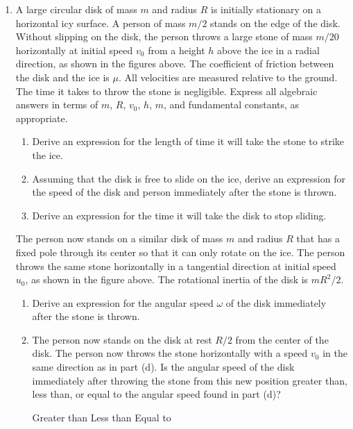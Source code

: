 \documentclass{../../../oss-classkick}
\begin{document}
\begin{enumerate}
\item A large circular disk of mass $m$ and radius $R$ is initially stationary
  on a horizontal icy surface. A person of mass $m/2$ stands on the edge of the
  disk. Without slipping on the disk, the person throws a large stone of mass
  $m/20$ horizontally at initial speed $v_0$ from a height $h$ above the ice in
  a radial direction, as shown in the figures above. The coefficient of
  friction between the disk and the ice is $\mu$. All velocities are measured
  relative to the ground. The time it takes to throw the stone is negligible.
  Express all algebraic answers in terms of $m$, $R$, $v_0$, $h$, $m$, and
  fundamental constants, as appropriate.
  \begin{enumerate}
  \item Derive an expression for the length of time it will take the stone to
    strike the ice.
  \item Assuming that the disk is free to slide on the ice, derive an
    expression for the speed of the disk and person immediately after the stone
    is thrown.
  \item Derive an expression for the time it will take the disk to stop sliding.
  \end{enumerate}
  \begin{center}
  \end{center}
  The person now stands on a similar disk of mass $m$ and radius $R$ that has a
  fixed pole through its center so that it can only rotate on the ice. The
  person throws the same stone horizontally in a tangential direction at
  initial speed $u_0$, as shown in the figure above. The rotational inertia of
  the disk is $mR^2/2$.
  \begin{enumerate}[resume]
  \item Derive an expression for the angular speed $\omega$ of the disk
    immediately after the stone is thrown.
  \item The person now stands on the disk at rest $R/2$ from the center of the
    disk. The person now throws the stone horizontally with a speed $v_0$ in
    the same direction as in part (d). Is the angular speed of the disk
    immediately after throwing the stone from this new position greater than,
    less than, or equal to the angular speed found in part (d)?

    \vspace{.1in}
    \underline{\hspace{.3in}} Greater than\hspace{.2in}
    \underline{\hspace{.3in}} Less than\hspace{.2in}
    \underline{\hspace{.3in}} Equal to
    

\end{enumerate}
\end{enumerate}
\end{document}
